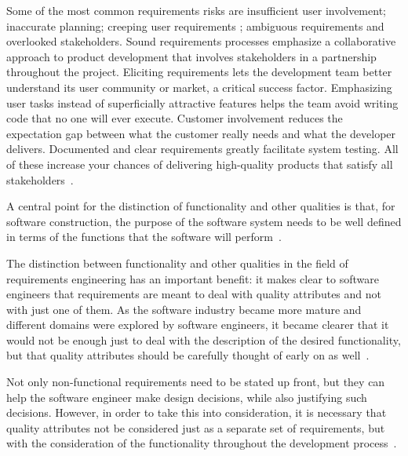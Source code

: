 \documentclass[dissertation,final]{softeng}
\begin{document}
Some of the most common requirements risks are insufficient user involvement; inaccurate planning; creeping user requirements ; ambiguous requirements and overlooked stakeholders. Sound requirements processes emphasize a collaborative approach to product development that involves stakeholders in a partnership throughout the project. Eliciting requirements lets the development team better understand its user community or market, a critical success factor. Emphasizing user tasks instead of superficially attractive features helps the team avoid writing code that no one will ever execute. Customer involvement reduces the expectation gap between what the customer really needs and what the developer delivers. Documented and clear requirements greatly facilitate system testing. All of these increase your chances of delivering high-quality products that satisfy all stakeholders~\citep{Wiegers2013}.

A central point for the distinction of functionality and other qualities is that, for software construction, the purpose of the software system needs to be well defined in terms of the functions that the software will perform~\citep{Chung:2009vg}.

The distinction between functionality and other qualities in the field of requirements engineering has an important benefit: it makes clear to software engineers that requirements are meant to deal with quality attributes and not with just one of them. As the software industry became more mature and different domains were explored by software engineers, it became clearer that it would not be enough just to deal with the description of the desired functionality, but that quality attributes should be carefully thought of early on as well~\citep{Chung:2009vg}.

Not only non-functional requirements need to be stated up front, but they can help the software engineer make design decisions, while also justifying such decisions. However, in order to take this into consideration, it is necessary that quality attributes not be considered just as a separate set of requirements, but with the consideration of the functionality throughout the development process~\citep{Chung:2009vg}.


\end{document}
